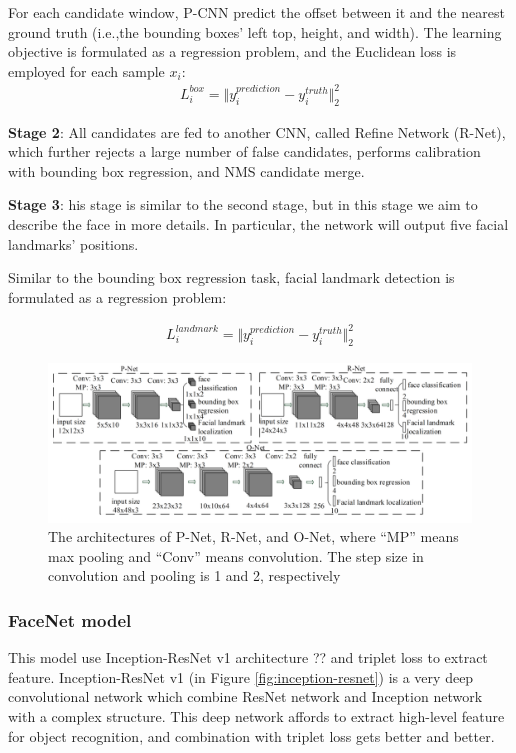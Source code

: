\documentclass[journal, twocolumn]{IEEEtran}
\begin{document}
For each candidate window, P-CNN predict the offset between it and the nearest ground truth (i.e.,the bounding boxes’ left top, height, and width). The learning objective is formulated as a regression problem, and  the Euclidean loss is employed for each sample $x_i$:
\begin{align}
	L_i^{box} = \Vert y_i^{prediction} - y_i^{truth} \Vert _2^2
\end{align}
		
\textbf{Stage 2}: All candidates are fed to another CNN, called Refine Network (R-Net), which further rejects a large number of false candidates, performs calibration with bounding box regression, and NMS candidate merge.

\textbf{Stage 3}: his stage is similar to the second stage, but in this stage we aim to describe the face in more details. In particular, the network will output five facial landmarks’ positions.

Similar to the bounding box regression task, facial landmark detection is formulated as a regression problem: 

\begin{align}
	L_i^{landmark} = \Vert y_i^{prediction} - y_i^{truth} \Vert _2^2
\end{align}

\begin{figure}
    \centering
    \includegraphics[width=1\linewidth]{img/mtcnn_arch.png}
	\caption{The architectures of P-Net, R-Net, and O-Net, where “MP” means max pooling and “Conv” means convolution. The step size in convolution and pooling
is 1 and 2, respectively}\label{fig:mtcnn-arch}
\end{figure}

\subsubsection{FaceNet model} 
This model use Inception-ResNet v1 architecture ?? and triplet loss to extract feature. Inception-ResNet v1 (in Figure \ref{fig:inception-resnet}) is a very deep convolutional network which combine ResNet network and Inception network with a complex structure. This deep network affords to extract high-level feature for object recognition, and combination with triplet loss gets better and better. 
\end{document}
